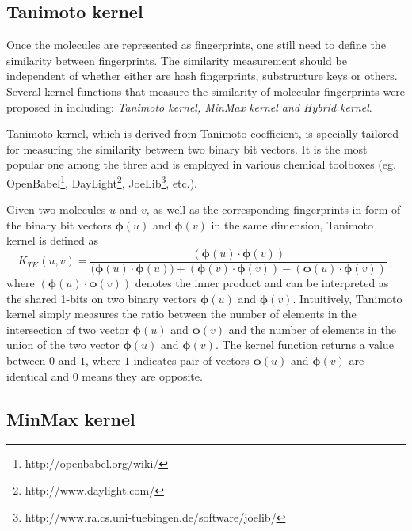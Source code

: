 \documentclass[english]{tktltiki}
\newcommand{\vphi}{\mathbf{\phi}}
\begin{document}
\subsection{Tanimoto kernel}

Once the molecules are represented as fingerprints, one still need to define the similarity between fingerprints. The similarity measurement should be independent of whether either are hash fingerprints, substructure keys or others. Several kernel functions that measure the similarity of molecular fingerprints were proposed in \cite{ralaivola05} including: {\em Tanimoto kernel, MinMax kernel and Hybrid kernel}. 

Tanimoto kernel, which is derived from Tanimoto coefficient, is specially tailored for measuring the similarity between two binary bit vectors. It is the most popular one among the three and is employed in various chemical toolboxes (eg. OpenBabel\footnote{http://openbabel.org/wiki/}, DayLight\footnote{http://www.daylight.com/}, JoeLib\footnote{http://www.ra.cs.uni-tuebingen.de/software/joelib/}, etc.). 

Given two molecules ${u}$ and ${v}$, as well as the corresponding fingerprints in form of the binary bit vectors $\vphi{(u)}$ and $\vphi{(v)}$ in the same dimension, Tanimoto kernel is defined as
\begin{equation}
K_{TK}(u,v) = 
\displaystyle\frac{(\vphi{(u)} \cdot \vphi{(v)})}{(\vphi{(u)} \cdot \vphi{(u))} + (\vphi{(v)} \cdot \vphi{(v)}) - (\vphi{(u)} \cdot \vphi{(v)})} \, ,
\label{tanimoto_definition}
\end{equation}
where $(\vphi{(u)} \cdot \vphi{(v)})$ denotes the inner product and can be interpreted as the shared 1-bits on two binary vectors $\vphi{(u)}$ and $\vphi{(v)}$. Intuitively, Tanimoto kernel simply measures the ratio between the number of elements in the intersection of two vector $\vphi{(u)}$ and $\vphi{(v)}$ and the number of elements in the union of the two vector $\vphi{(u)}$ and $\vphi{(v)}$. The kernel function returns a value between $0$ and $1$, where $1$ indicates pair of vectors $\vphi{(u)}$ and $\vphi{(v)}$ are identical and $0$ means they are opposite.


\subsection{MinMax kernel}
\end{document}
